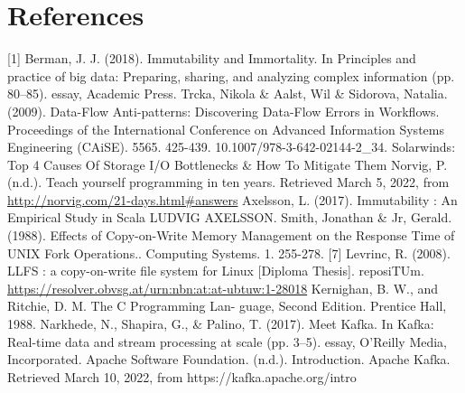 \documentclass[12pt,twoside]{article}
\begin{document}
\section*{References}
[1] Berman, J. J. (2018). Immutability and Immortality. In Principles and practice of big data: Preparing, sharing, and analyzing complex information (pp. 80–85). essay, Academic Press. \newline
[2] Trcka, Nikola \& Aalst, Wil \& Sidorova, Natalia. (2009). Data-Flow Anti-patterns: Discovering Data-Flow Errors in Workflows. Proceedings of the International Conference on Advanced Information Systems Engineering (CAiSE). 5565. 425-439. 10.1007/978-3-642-02144-2_34. \newline
[3] Solarwinds: Top 4 Causes Of Storage I/O Bottlenecks \& How To Mitigate Them \newline
[4] Norvig, P. (n.d.). Teach yourself programming in ten years. Retrieved March 5, 2022, from \url{http://norvig.com/21-days.html#answers} \newline
[5] Axelsson, L. (2017). Immutability : An Empirical Study in Scala LUDVIG AXELSSON. \newline 
[6] Smith, Jonathan \& Jr, Gerald. (1988). Effects of Copy-on-Write Memory Management on the Response Time of UNIX Fork Operations.. Computing Systems. 1. 255-278.
[7] Levrinc, R. (2008). LLFS : a copy-on-write file system for Linux [Diploma Thesis]. reposiTUm. \url{https://resolver.obvsg.at/urn:nbn:at:at-ubtuw:1-28018} \newline
[8] Kernighan, B. W., and Ritchie, D. M. The C Programming Lan-
guage, Second Edition. Prentice Hall, 1988. \newline
[9] Narkhede, N., Shapira, G., \& Palino, T. (2017). Meet Kafka. In Kafka: Real-time data and stream processing at scale (pp. 3–5). essay, O'Reilly Media, Incorporated. \newline
[10] Apache Software Foundation. (n.d.). Introduction. Apache Kafka. Retrieved March 10, 2022, from https://kafka.apache.org/intro 

\end{document}
